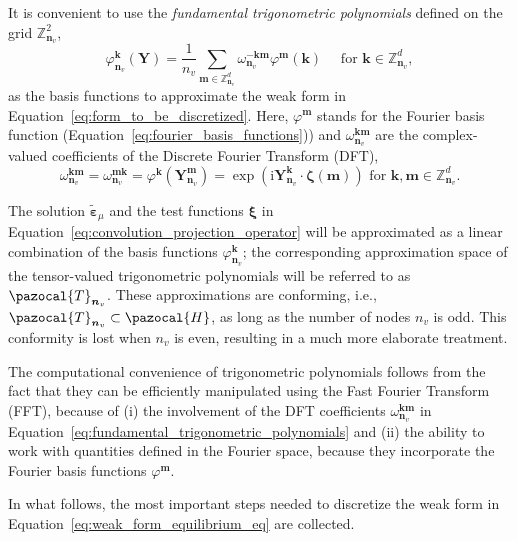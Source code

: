 It is convenient to use the \textit{fundamental trigonometric polynomials} defined on the grid \(\mathbb{Z}_{\bm n_v}^{2}\),
\begin{equation}\label{eq:fundamental_trigonometric_polynomials}
\varphi_{\bm n_v}^{\bm k}(\bm{Y})=\frac{1}{n_v} \sum_{\bm{ m} \in \mathbb{Z}_{\bm n_v}^{d}} \omega_{\bm n_v}^{-\bm{ k  m}} \varphi^{\bm  m}(\bm{ k})\quad \text { for } \bm{ k} \in \mathbb{Z}_{\bm n_v}^{d},
\end{equation}
as the basis functions to approximate the weak form in Equation~\eqref{eq:form_to_be_discretized}.
Here, \(\varphi^{\bm  m}\) stands for the Fourier basis function (Equation~\eqref{eq:fourier_basis_functions})) and \(\omega_{\bm n_v}^{\bm  k \bm m}\) are the complex-valued coefficients of the Discrete Fourier Transform (DFT),
\begin{equation} \label{eq:def_dft_coefficients}
\omega_{\bm n_v}^{\bm  k \bm  m}=\omega_{\bm n_v}^{\bm  m\bm  k}=\varphi^{\bm  k}\left(\bm Y_{\bm n_v}^{\bm  m}\right)=\exp \left(\mathrm{i}\bm Y_{\bm n_v}^{\bm  k}\cdot \bm \zeta (\bm m)\right) \text { for } \bm{ k}, \bm{ m} \in \mathbb{Z}_{\bm n_v}^{d}.
\end{equation}

The solution \(\tilde{\bm\varepsilon}_\mu\) and the test functions \(\bm \xi\) in Equation~\eqref{eq:convolution_projection_operator} will be approximated as a linear combination of the basis functions \(\varphi_{\bm n_v}^{\bm  k}\); the corresponding approximation space of the tensor-valued trigonometric polynomials will be referred to as \(\pazocal{T}_{\bm n_v}\).
These approximations are conforming, i.e., \(\pazocal{T}_{\bm n_v} \subset \pazocal{H}\), as long as the number of nodes \(n_v\) is odd.
This conformity is lost when \(n_v\) is even, resulting in a much more elaborate treatment.

The computational convenience of trigonometric polynomials follows from the fact that they can be efficiently manipulated using the Fast Fourier Transform (FFT), because of (i) the involvement of the DFT coefficients \(\omega_{\bm n_v}^{\bm  k\bm  m}\) in Equation~\eqref{eq:fundamental_trigonometric_polynomials} and (ii) the ability to work with quantities defined in the Fourier space, because they incorporate the Fourier basis functions \(\varphi^{\bm m}\).

In what follows, the most important steps needed to discretize the weak form in Equation~\eqref{eq:weak_form_equilibrium_eq} are collected.

